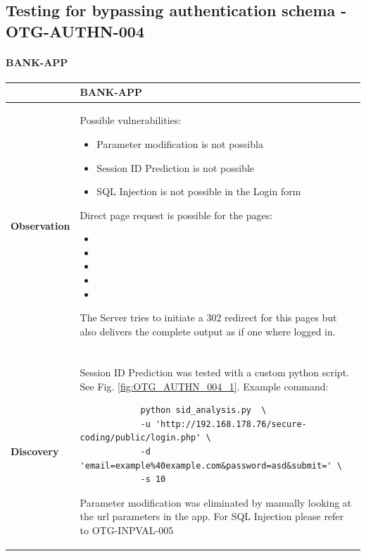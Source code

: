 \subsection{Testing for bypassing authentication schema - OTG-AUTHN-004}
\paragraph{BANK-APP} \mbox{}
\begin{longtable*}{p{.20\textwidth} | p{.80\textwidth}}
    \hline
    & \textbf{BANK-APP} \\ 
    \hline
    \textbf{Observation} &
    	Possible vulnerabilities:
        \begin{itemize}
		  \item Parameter modification is not possibla
		  \item Session ID Prediction is not possible
		  \item SQL Injection is not possible in the Login form
		\end{itemize}
		Direct page request is possible for the pages:
		\begin{itemize}
		  \item {}
		  \item {}
		  \item {}
		  \item {}
		  \item {}
		\end{itemize}
		The Server tries to initiate a 302 redirect for this pages but also delivers the complete output as if one where logged in.
    \\\\
    \textbf{Discovery} &
        Session ID Prediction was tested with a custom python script. See Fig. \ref{fig:OTG_AUTHN_004_1}. Example command:
        \begin{lstlisting}
			python sid_analysis.py  \
			-u 'http://192.168.178.76/secure-coding/public/login.php' \
			-d 'email=example%40example.com&password=asd&submit=' \ 
			-s 10
		\end{lstlisting}
        Parameter modification was eliminated by manually looking at the url parameters in the app. \newline
        For SQL Injection please refer to OTG-INPVAL-005 \newline

\end{longtable*}

